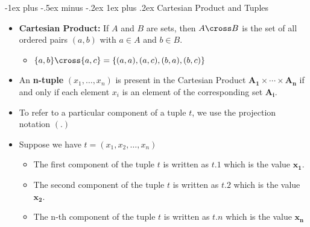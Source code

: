 \documentclass[10pt, landscape]{article}
\makeatletter
\renewcommand{\subsubsection}{\@startsection{subsubsection}{3}{0mm}%
  {-1ex plus -.5ex minus -.2ex}%
  {1ex plus .2ex}%
{\normalfont\small\bfseries}}%
\makeatother
\begin{document}
\begin{multicols*}{3}
  \subsubsection{Cartesian Product and Tuples}
  \begin{itemize}
    \item \textbf{Cartesian Product:} If $A$ and $B$ are sets, then $A \cross B$ is the set of all ordered pairs $(a, b)$ with $a \in A$ and $b \in B$.
    \begin{itemize}
      \item $\{a, b\} \cross \{a, c\} = \{(a, a), (a, c), (b, a), (b, c)\}$
    \end{itemize}
    \item An \textbf{n-tuple} $(x_1, \ldots, x_n)$ is present in the Cartesian Product $\mathbf{A_1 \times \cdots \times A_n}$ if and only if each element $x_i$ is an element of the corresponding set $\mathbf{A_i}$.
    \item To refer to a particular component of a tuple $t$, we use the projection notation $(.)$
    \item Suppose we have $t = (x_1, x_2, \ldots, x_n)$
    \begin{itemize}
        \item The first component of the tuple $t$ is written as $t.1$ which is the value $\mathbf{x_1}$.
        \item The second component of the tuple $t$ is written as $t.2$ which is the value $\mathbf{x_2}$.
        \item The n-th component of the tuple $t$ is written as $t.n$ which is the value $\mathbf{x_n}$
    \end{itemize}
  \end{itemize}

\end{multicols*}
\end{document}

